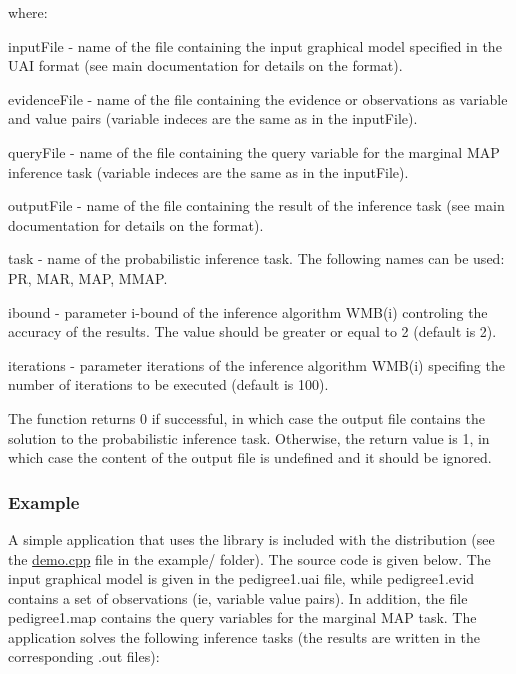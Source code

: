 where\+:
\begin{DoxyItemize}
\item {\ttfamily input\+File} -\/ name of the file containing the input graphical model specified in the U\+A\+I format (see main documentation for details on the format).
\item {\ttfamily evidence\+File} -\/ name of the file containing the evidence or observations as variable and value pairs (variable indeces are the same as in the {\ttfamily input\+File}).
\item {\ttfamily query\+File} -\/ name of the file containing the query variable for the marginal M\+A\+P inference task (variable indeces are the same as in the {\ttfamily input\+File}).
\item {\ttfamily output\+File} -\/ name of the file containing the result of the inference task (see main documentation for details on the format).
\item {\ttfamily task} -\/ name of the probabilistic inference task. The following names can be used\+: P\+R, M\+A\+R, M\+A\+P, M\+M\+A\+P.
\item {\ttfamily ibound} -\/ parameter i-\/bound of the inference algorithm {\ttfamily W\+M\+B(i)} controling the accuracy of the results. The value should be greater or equal to 2 (default is 2).
\item {\ttfamily iterations} -\/ parameter iterations of the inference algorithm {\ttfamily W\+M\+B(i)} specifing the number of iterations to be executed (default is 100).
\end{DoxyItemize}

The function returns 0 if successful, in which case the output file contains the solution to the probabilistic inference task. Otherwise, the return value is 1, in which case the content of the output file is undefined and it should be ignored.

\subsubsection*{Example}

A simple application that uses the library is included with the distribution (see the {\ttfamily \hyperlink{demo_8cpp_source}{demo.\+cpp}} file in the {\ttfamily example/} folder). The source code is given below. The input graphical model is given in the {\ttfamily pedigree1.\+uai} file, while {\ttfamily pedigree1.\+evid} contains a set of observations (ie, variable value pairs). In addition, the file {\ttfamily pedigree1.\+map} contains the query variables for the marginal M\+A\+P task. The application solves the following inference tasks (the results are written in the corresponding {\ttfamily .out} files)\+:


